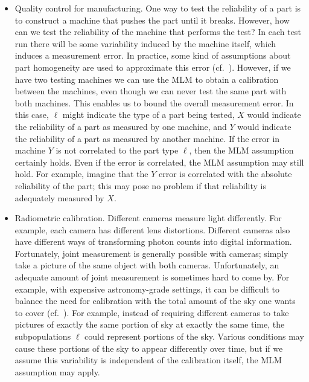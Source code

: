 \begin{itemize}
    \item Quality control for manufacturing.   One way to test the reliability of a part is to construct a machine that pushes the part until it breaks.  However, how can we test the reliability of the machine that performs the test?  In each test run there will be some variability induced by the machine itself, which induces a measurement error.  In practice, some kind of assumptions about part homogeneity are used to approximate this error (cf.\ \cite{de2005gauge}).  However, if we have two testing machines we can use the MLM to obtain a calibration between the machines, even though we can never test the same part with both machines.  This enables us to bound the overall measurement error.  In this case, $\ell$ might indicate the type of a part being tested, $X$ would indicate the reliability of a part as measured by one machine, and $Y$ would indicate the reliability of a part as measured by another machine.  If the error in machine $Y$ is not correlated to the part type $\ell$, then the MLM assumption certainly holds.  Even if the error is correlated, the MLM assumption may still hold.  For example, imagine that the $Y$ error is correlated with the absolute reliability of the part; this may pose no problem if that reliability is adequately measured by $X$.  

    \item Radiometric calibration.  Different cameras measure light differently.  For example, each camera has different lens distortions.  Different cameras also have different ways of transforming photon counts into digital information.   Fortunately, joint measurement is generally possible with cameras; simply take a picture of the same object with both cameras.  Unfortunately, an adequate amount of joint measurement is sometimes hard to come by.  For example, with expensive astronomy-grade settings, it can be difficult to balance the need for calibration with the total amount of the sky one wants to cover (cf.\ \cite{padmanabhan2008improved}). For example, instead of requiring different cameras to take pictures of exactly the same portion of sky at exactly the same time, the subpopulations $\ell$ could represent portions of the sky.  Various conditions may cause these portions of the sky to appear differently over time, but if we assume this variability is independent of the calibration itself, the MLM assumption may apply.  
 

\end{itemize}
